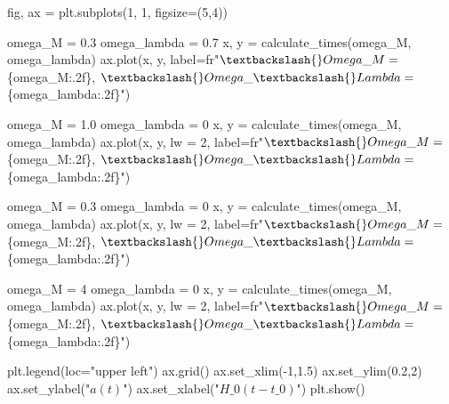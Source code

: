 \documentclass[
  letterpaper,
  DIV=11,
  numbers=noendperiod]{scrreprt}
\newenvironment{Shaded}{\begin{snugshade}}{\end{snugshade}}
\newcommand{\DecValTok}[1]{\textcolor[rgb]{0.68,0.00,0.00}{#1}}
\newcommand{\FloatTok}[1]{\textcolor[rgb]{0.68,0.00,0.00}{#1}}
\newcommand{\NormalTok}[1]{\textcolor[rgb]{0.00,0.23,0.31}{#1}}
\newcommand{\OperatorTok}[1]{\textcolor[rgb]{0.37,0.37,0.37}{#1}}
\newcommand{\SpecialCharTok}[1]{\textcolor[rgb]{0.37,0.37,0.37}{#1}}
\newcommand{\StringTok}[1]{\textcolor[rgb]{0.13,0.47,0.30}{#1}}
\newcommand{\VerbatimStringTok}[1]{\textcolor[rgb]{0.13,0.47,0.30}{#1}}
\begin{document}
\begin{Shaded}
\begin{Highlighting}[]
\NormalTok{fig, ax }\OperatorTok{=}\NormalTok{ plt.subplots(}\DecValTok{1}\NormalTok{, }\DecValTok{1}\NormalTok{, figsize}\OperatorTok{=}\NormalTok{(}\DecValTok{5}\NormalTok{,}\DecValTok{4}\NormalTok{))}

\NormalTok{omega\_M }\OperatorTok{=} \FloatTok{0.3}
\NormalTok{omega\_lambda }\OperatorTok{=} \FloatTok{0.7}
\NormalTok{x, y }\OperatorTok{=}\NormalTok{ calculate\_times(omega\_M, omega\_lambda)}
\NormalTok{ax.plot(x, y, label}\OperatorTok{=}\VerbatimStringTok{fr"$\textbackslash{}Omega\_M =$ }\SpecialCharTok{\{}\NormalTok{omega\_M}\SpecialCharTok{:.2f\}}\VerbatimStringTok{, $\textbackslash{}Omega\_\textbackslash{}Lambda =$ }\SpecialCharTok{\{}\NormalTok{omega\_lambda}\SpecialCharTok{:.2f\}}\VerbatimStringTok{"}\NormalTok{)}

\NormalTok{omega\_M }\OperatorTok{=} \FloatTok{1.0}
\NormalTok{omega\_lambda }\OperatorTok{=} \DecValTok{0}
\NormalTok{x, y }\OperatorTok{=}\NormalTok{ calculate\_times(omega\_M, omega\_lambda)}
\NormalTok{ax.plot(x, y, lw }\OperatorTok{=} \DecValTok{2}\NormalTok{, label}\OperatorTok{=}\VerbatimStringTok{fr"$\textbackslash{}Omega\_M =$ }\SpecialCharTok{\{}\NormalTok{omega\_M}\SpecialCharTok{:.2f\}}\VerbatimStringTok{, $\textbackslash{}Omega\_\textbackslash{}Lambda =$ }\SpecialCharTok{\{}\NormalTok{omega\_lambda}\SpecialCharTok{:.2f\}}\VerbatimStringTok{"}\NormalTok{)}

\NormalTok{omega\_M }\OperatorTok{=} \FloatTok{0.3}
\NormalTok{omega\_lambda }\OperatorTok{=} \DecValTok{0}
\NormalTok{x, y }\OperatorTok{=}\NormalTok{ calculate\_times(omega\_M, omega\_lambda)}
\NormalTok{ax.plot(x, y, lw }\OperatorTok{=} \DecValTok{2}\NormalTok{, label}\OperatorTok{=}\VerbatimStringTok{fr"$\textbackslash{}Omega\_M =$ }\SpecialCharTok{\{}\NormalTok{omega\_M}\SpecialCharTok{:.2f\}}\VerbatimStringTok{, $\textbackslash{}Omega\_\textbackslash{}Lambda =$ }\SpecialCharTok{\{}\NormalTok{omega\_lambda}\SpecialCharTok{:.2f\}}\VerbatimStringTok{"}\NormalTok{)}

\NormalTok{omega\_M }\OperatorTok{=} \DecValTok{4}
\NormalTok{omega\_lambda }\OperatorTok{=} \DecValTok{0}
\NormalTok{x, y }\OperatorTok{=}\NormalTok{ calculate\_times(omega\_M, omega\_lambda)}
\NormalTok{ax.plot(x, y, lw }\OperatorTok{=} \DecValTok{2}\NormalTok{, label}\OperatorTok{=}\VerbatimStringTok{fr"$\textbackslash{}Omega\_M =$ }\SpecialCharTok{\{}\NormalTok{omega\_M}\SpecialCharTok{:.2f\}}\VerbatimStringTok{, $\textbackslash{}Omega\_\textbackslash{}Lambda =$ }\SpecialCharTok{\{}\NormalTok{omega\_lambda}\SpecialCharTok{:.2f\}}\VerbatimStringTok{"}\NormalTok{)}


\NormalTok{plt.legend(loc}\OperatorTok{=}\StringTok{"upper left"}\NormalTok{)}
\NormalTok{ax.grid()}
\NormalTok{ax.set\_xlim(}\OperatorTok{{-}}\DecValTok{1}\NormalTok{,}\FloatTok{1.5}\NormalTok{)}
\NormalTok{ax.set\_ylim(}\FloatTok{0.2}\NormalTok{,}\DecValTok{2}\NormalTok{)}
\NormalTok{ax.set\_ylabel(}\StringTok{"$a(t)$"}\NormalTok{)}
\NormalTok{ax.set\_xlabel(}\StringTok{"$H\_0 (t {-} t\_0)$"}\NormalTok{)}
\NormalTok{plt.show()}
\end{Highlighting}
\end{Shaded}
\end{document}
